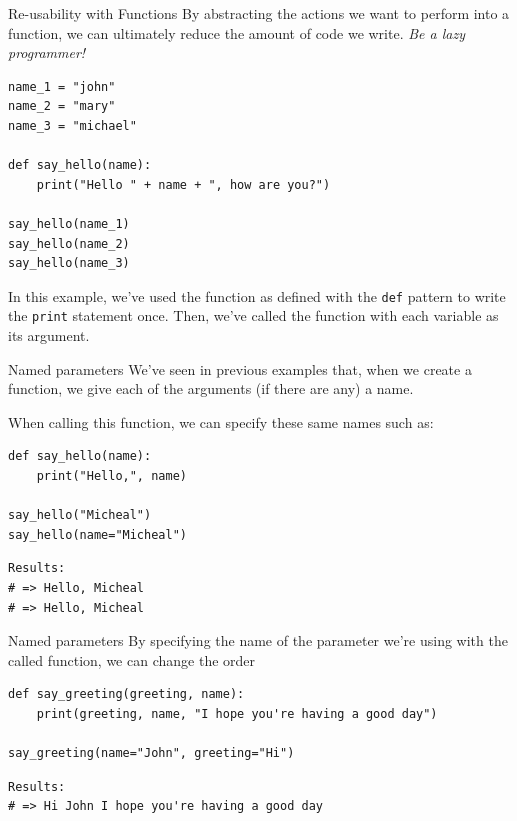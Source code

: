 \documentclass[10pt]{beamer}
\begin{document}
\begin{frame}[label={sec:org9475546},fragile]{Re-usability with Functions}
 By abstracting the actions we want to perform into a function, we can ultimately
reduce the amount of code we write. \emph{Be a lazy programmer!}

\begin{verbatim}
name_1 = "john"
name_2 = "mary"
name_3 = "michael"

def say_hello(name):
    print("Hello " + name + ", how are you?")

say_hello(name_1)
say_hello(name_2)
say_hello(name_3)
\end{verbatim}

In this example, we've used the function as defined with the \texttt{def} pattern to write
the \texttt{print} statement once. Then, we've called the function with each variable as its
argument.
\end{frame}

\begin{frame}[label={sec:org6ea89d1},fragile]{Named parameters}
 We've seen in previous examples that, when we create a function, we give each of the
arguments (if there are any) a name.

When calling this function, we can specify these same names such as:

\begin{verbatim}
def say_hello(name):
    print("Hello,", name)

say_hello("Micheal")
say_hello(name="Micheal")
\end{verbatim}

\begin{verbatim}
Results: 
# => Hello, Micheal
# => Hello, Micheal
\end{verbatim}
\end{frame}

\begin{frame}[label={sec:orgaabe22a},fragile]{Named parameters}
 By specifying the name of the parameter we're using with the called function, we can
change the order

\begin{verbatim}
def say_greeting(greeting, name):
    print(greeting, name, "I hope you're having a good day")

say_greeting(name="John", greeting="Hi")
\end{verbatim}

\begin{verbatim}
Results: 
# => Hi John I hope you're having a good day
\end{verbatim}
\end{frame}
\end{document}
